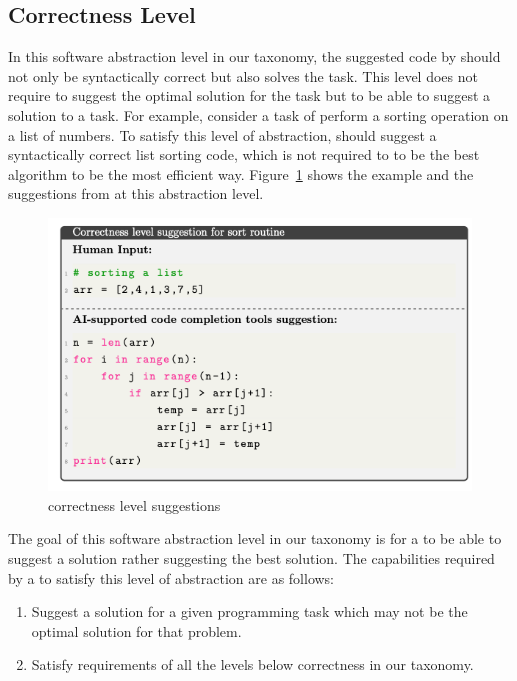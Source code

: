 \subsection{Correctness Level}
\label{correctness}
In this software abstraction level in our taxonomy, the suggested code by \cct{} should not only be syntactically correct but also solves the task. 
This level does not require \cct{} to suggest the optimal solution for the task but to be able to suggest a solution to a task.
For example, consider a task of perform a sorting operation on a list of numbers. To satisfy this level of abstraction, \cct{} should suggest a syntactically correct list sorting code, which is not required to to be the best algorithm to be the most efficient way.
Figure~\ref{fig:correctness} shows the example and the suggestions from \cct{} at this abstraction level.

\begin{figure}[hbt!]
    \centering
    \includegraphics[width=.9\linewidth]{Figures/correctness.png}
    \caption{\cct{} correctness level suggestions}
    \label{fig:correctness}
\end{figure}

The goal of this software abstraction level in our taxonomy is for a \cct{} to be able to suggest a solution rather suggesting the best solution.
The capabilities required by a \cct{} to satisfy this level of abstraction are as follows:

\begin{enumerate}
    \item Suggest a solution for a given programming task which may not be the optimal solution for that problem.
    \item Satisfy requirements of all the levels below correctness in our taxonomy.
\end{enumerate}

